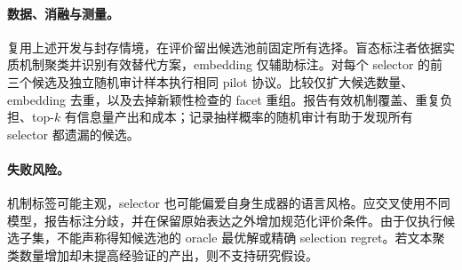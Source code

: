 \paragraph{数据、消融与测量。}
复用上述开发与封存情境，在评价留出候选池前固定所有选择。盲态标注者依据实质机制聚类并识别有效替代方案，embedding 仅辅助标注。对每个 selector 的前三个候选及独立随机审计样本执行相同 pilot 协议。比较仅扩大候选数量、embedding 去重，以及去掉新颖性检查的 facet 重组。报告有效机制覆盖、重复负担、top-$k$ 有信息量产出和成本；记录抽样概率的随机审计有助于发现所有 selector 都遗漏的候选。

\paragraph{失败风险。}
机制标签可能主观，selector 也可能偏爱自身生成器的语言风格。应交叉使用不同模型，报告标注分歧，并在保留原始表达之外增加规范化评价条件。由于仅执行候选子集，不能声称得知候选池的 oracle 最优解或精确 selection regret。若文本聚类数量增加却未提高经验证的产出，则不支持研究假设。
